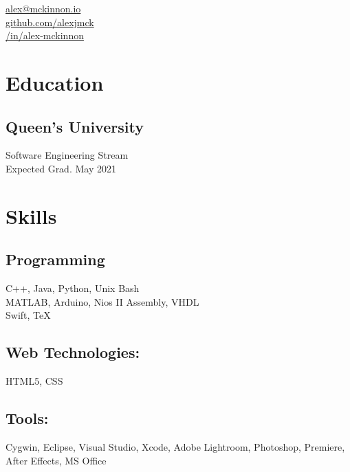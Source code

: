 \documentclass[]{hieudo-build}
\begin{document}
%
%
{
	\faEnvelope \href{mailto:alex@mckinnon.io}{ alex@mckinnon.io}\\
	\faGithub \href{https://github.com/alexjmck}{   github.com/alexjmck}\\
	\faLinkedinSquare \href{https://www.linkedin.com/in/alex-mckinnon}{   /in/alex-mckinnon}
}
    
%
%
\begin{minipage}[t]{0.3\textwidth} 

\section{Education} 

\subsection{Queen's University}
Software Engineering Stream \\
Expected Grad. May 2021 \\
\sectionsep

\section{Skills}
\subsection{Programming}
C++, Java, Python, Unix Bash\\ 
MATLAB, Arduino, Nios II Assembly, VHDL\\ 
Swift, \TeX

\subsection{Web Technologies:}
HTML5, CSS \\

\subsection{Tools:}
Cygwin, Eclipse, Visual Studio, 
Xcode, Adobe Lightroom, 
Photoshop, Premiere, \\
After Effects, MS Office \\ 


\end{minipage}
\end{document}
